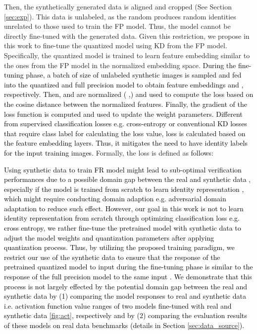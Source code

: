 \documentclass[a4paper,conference]{IEEEtran}
\begin{document}
Then, the synthetically generated data is aligned and cropped (See Section \ref{sec:exp}).
This data is unlabeled, as the random  produces random identities unrelated to those used to train the FP model. Thus, the model cannot be directly fine-tuned with the generated data.
Given this restriction, we propose in this work to fine-tune the quantized model using KD from the FP model. Specifically, the quantized model is trained to learn feature embedding similar to the ones from the FP model in the normalized embedding space. 
\textcolor{black}{
During the fine-tuning phase, a batch of size  of unlabeled synthetic images  is sampled and fed into the quantized and full precision model to obtain feature embeddings  and , respectively.}
\textcolor{black}{
Then,  and  are normalized ( ,) and used to compute the  loss based on the cosine distance between the normalized features.
Finally, the gradient of the  loss function is computed and used to update the weight parameters. 
Different from supervised classification losses e.g. cross-entropy or conventional KD losses \cite{DBLP:journals/corr/HintonVD15} that require class label for calculating the loss value,   loss is calculated based on the feature embedding layers. Thus, it mitigates the need to have identity labels for the input training images.}
Formally, the  loss is defined as \textcolor{black}{follows}:
\vspace{-2mm}


\textcolor{black}{
Using synthetic data to train FR model might lead to sub-optimal verification performances \cite{Qiu_2021_ICCV} due to a possible domain gap between the real and synthetic data \cite{DBLP:conf/aaai/XuZNLWTZ20,DBLP:conf/cvpr/Sankaranarayanan18,DBLP:conf/cvpr/LeePYL20}, especially if the model is trained from scratch to learn identity representation \cite{Qiu_2021_ICCV}, which might require conducting domain adaption e.g. adversarial domain adaptation \cite{DBLP:conf/aaai/XuZNLWTZ20,Qiu_2021_ICCV} to reduce such effect.
However, our goal in this work is not to learn identity representation from scratch through optimizing classification loss e.g. cross entropy, we rather fine-tune the pretrained model with synthetic data to adjust the model weights and quantization parameters after applying quantization process. 
Thus, by utilizing the proposed training paradigm, we restrict our use of the synthetic data to ensure that the response of the pretrained quantized model to input  during the fine-tuning phase is similar to the response of the full precision model to the same input .
We demonstrate that this process is not largely effected by the potential domain gap between the real and synthetic data by (1) comparing the model responses to real and synthetic data i.e. activation function value ranges of two models fine-tuned with real and synthetic data \ref{fig:act}, respectively and by (2) comparing the evaluation results of these models on real data benchmarks (details in Section \ref{sec:data_source}). 
}
\end{document}
